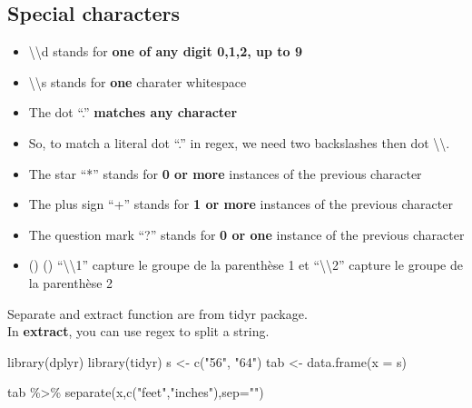 \documentclass[
]{book}
\newenvironment{Shaded}{\begin{snugshade}}{\end{snugshade}}
\newcommand{\AttributeTok}[1]{\textcolor[rgb]{0.77,0.63,0.00}{#1}}
\newcommand{\FunctionTok}[1]{\textcolor[rgb]{0.00,0.00,0.00}{#1}}
\newcommand{\NormalTok}[1]{#1}
\newcommand{\OtherTok}[1]{\textcolor[rgb]{0.56,0.35,0.01}{#1}}
\newcommand{\SpecialCharTok}[1]{\textcolor[rgb]{0.00,0.00,0.00}{#1}}
\newcommand{\StringTok}[1]{\textcolor[rgb]{0.31,0.60,0.02}{#1}}
\providecommand{\tightlist}{%
  \setlength{\itemsep}{0pt}\setlength{\parskip}{0pt}}
\begin{document}
\hypertarget{special-characters}{%
\subsection{Special characters}\label{special-characters}}

\begin{itemize}
\tightlist
\item
  \textbackslash\textbackslash d stands for \textbf{one of any digit 0,1,2, up to 9}
\item
  \textbackslash\textbackslash s stands for \textbf{one } charater whitespace
\item
  The dot ``.'' \textbf{matches any character}
\item
  So, to match a literal dot ``.'' in regex, we need two backslashes then dot \textbackslash\textbackslash.
\item
  The star ``*'' stands for \textbf{0 or more} instances of the previous character
\item
  The plus sign ``+'' stands for \textbf{1 or more} instances of the previous character
\item
  The question mark ``?'' stands for \textbf{0 or one} instance of the previous character
\item
  () () ``\textbackslash\textbackslash1'' capture le groupe de la parenthèse 1 et ``\textbackslash\textbackslash2'' capture le groupe de la parenthèse 2
\end{itemize}

Separate and extract function are from tidyr package.\\
In \textbf{extract}, you can use regex to split a string.

\begin{Shaded}
\begin{Highlighting}[]
\FunctionTok{library}\NormalTok{(dplyr)}
\FunctionTok{library}\NormalTok{(tidyr)}
\NormalTok{s }\OtherTok{\textless{}{-}} \FunctionTok{c}\NormalTok{(}\StringTok{"5\textquotesingle{}6"}\NormalTok{, }\StringTok{"6\textquotesingle{}4"}\NormalTok{)}
\NormalTok{tab }\OtherTok{\textless{}{-}} \FunctionTok{data.frame}\NormalTok{(}\AttributeTok{x =}\NormalTok{ s)}

\NormalTok{tab }\SpecialCharTok{\%\textgreater{}\%} \FunctionTok{separate}\NormalTok{(x,}\FunctionTok{c}\NormalTok{(}\StringTok{"feet"}\NormalTok{,}\StringTok{"inches"}\NormalTok{),}\AttributeTok{sep=}\StringTok{"\textquotesingle{}"}\NormalTok{)}
\end{Highlighting}
\end{Shaded}
\end{document}

